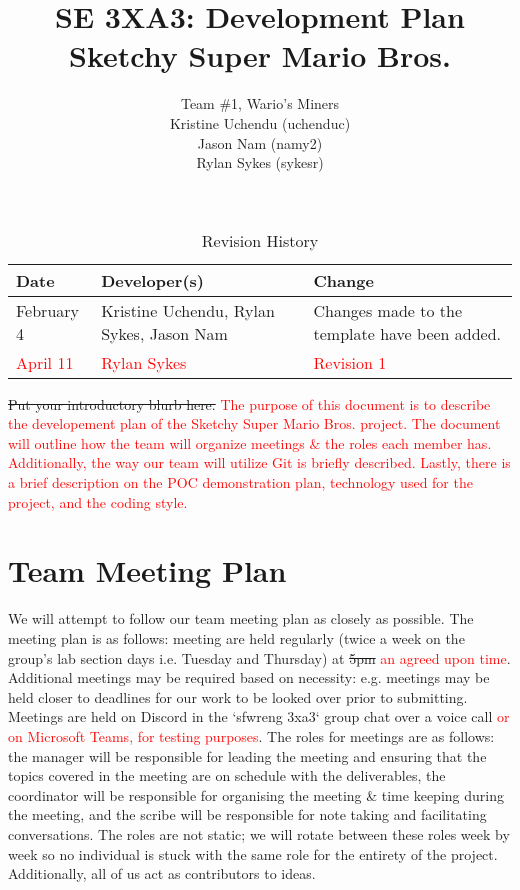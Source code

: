 \documentclass{article}
\title{SE 3XA3: Development Plan\\Sketchy Super Mario Bros.}
\author{Team \#1, Wario's Miners
		\\ Kristine Uchendu (uchenduc)
		\\ Jason Nam (namy2)
		\\ Rylan Sykes (sykesr)
}
\date{}
\begin{document}
\begin{table}[hp]
\caption{Revision History} \label{TblRevisionHistory}
\begin{tabularx}{\textwidth}{llX}
\toprule
\textbf{Date} & \textbf{Developer(s)} & \textbf{Change}\\
\midrule
February 4 & Kristine Uchendu, Rylan Sykes, Jason Nam & Changes made to the template have been added.\\
\textcolor{red}{April 11} & \textcolor{red}{Rylan Sykes} & \textcolor{red}{Revision 1}\\
\bottomrule
\end{tabularx}
\end{table}

\newpage

\maketitle

\st{Put your introductory blurb here.}
\textcolor{red}{
	The purpose of this document is to describe the developement plan of the Sketchy Super Mario Bros. project. The document will outline how the team will organize meetings \& the roles each member has. Additionally, the way our team will utilize Git is briefly described. Lastly, there is a brief description on the POC demonstration plan, technology used for the project, and the coding style.
}

\section{Team Meeting Plan}

We will attempt to follow our team meeting plan as closely as possible. The meeting plan is as follows: meeting are held regularly (twice a week on the group’s lab section days i.e. Tuesday and Thursday) at \st{5pm} \textcolor{red}{an agreed upon time}. Additional meetings may be required based on necessity: e.g. meetings may be held closer to deadlines for our work to be looked over prior to submitting. Meetings are held on Discord in the `sfwreng 3xa3` group chat over a voice call \textcolor{red}{or on Microsoft Teams, for testing purposes}. The roles for meetings are as follows: the manager will be responsible for leading the meeting and ensuring that the topics covered in the meeting are on schedule with the deliverables, the coordinator will be responsible for organising the meeting \& time keeping during the meeting, and the scribe will be responsible for note taking and facilitating conversations. The roles are not static; we will rotate between these roles week by week so no individual is stuck with the same role for the entirety of the project. Additionally, all of us act as contributors to ideas.
\end{document}
